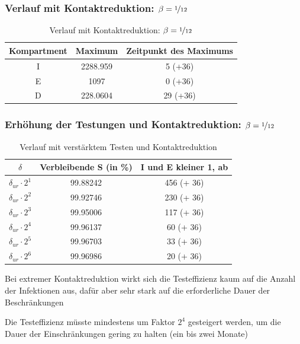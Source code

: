 \documentclass{beamer}
\begin{document}
\begin{frame}
	\frametitle{Verlauf mit Kontaktreduktion: $\beta = \nicefrac{1}{12}$}
	\begin{table}[h]
		\caption{Verlauf mit Kontaktreduktion: $\beta = \nicefrac{1}{12}$}
		\centering
		\begin{tabular}{@{}ccc@{}}
			\toprule
			Kompartment & Maximum & Zeitpunkt des Maximums\\ 
			\midrule
			I & 2288.959 & 5 (+36)\\ 
			E & 1097 & 0 (+36)\\ 
			D & 228.0604 &  29 (+36)\\ 
			\bottomrule
		\end{tabular}
	\end{table}
\end{frame}

\begin{frame}
	\frametitle{Erhöhung der Testungen und Kontaktreduktion: $\beta = \nicefrac{1}{12}$}
	\begin{table}[h]
		\caption{Verlauf mit verstärktem Testen und Kontaktreduktion}
		\centering
		\begin{tabular}{@{}ccc@{}}
			\toprule
			$\delta$ & Verbleibende S (in \%) & I und E kleiner 1, ab\\ 
			\midrule
			 $\delta_{ur} \cdot 2^1$ & 99.88242 & 456 (+ 36) \\ 
			 $\delta_{ur} \cdot 2^2$ & 99.92746 & 230 (+ 36)\\  
			 $\delta_{ur} \cdot 2^3$ & 99.95006 & 117 (+ 36) \\ 
			 $\delta_{ur} \cdot 2^4$ & 99.96137 & 60 (+ 36)\\ 
			 $\delta_{ur} \cdot 2^5$ & 99.96703 & 33 (+ 36)\\ 
			 $\delta_{ur} \cdot 2^6$ & 99.96986 & 20 (+ 36)\\ 
			\bottomrule
		\end{tabular}
	\end{table}
	\begin{arrowlist}
		\item Bei extremer Kontaktreduktion wirkt sich die Testeffizienz kaum auf die Anzahl der Infektionen aus, dafür aber sehr stark auf die erforderliche Dauer der Beschränkungen
		\item Die Testeffizienz müsste mindestens um Faktor $2^4$ gesteigert werden, um die Dauer der Einschränkungen gering zu halten (ein bis zwei Monate)
	\end{arrowlist}
\end{frame}
\end{document}
